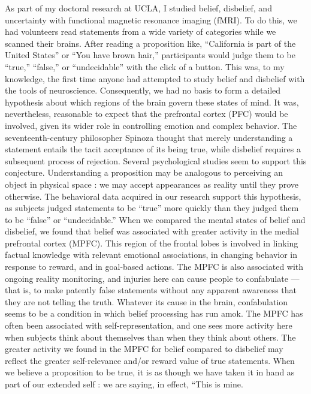 \documentclass[a4paper,14pt]{extarticle}
\begin{document}
As part of my doctoral research at UCLA, I studied belief, disbelief, and uncertainty with functional magnetic resonance imaging (fMRI).
To do this, we had volunteers read statements from a wide variety of categories while we scanned their brains.
After reading a proposition like, ``California is part of the United States'' or ``You have brown hair,'' participants would judge them to be ``true,'' ``false,'' or ``undecidable'' with the click of a button.
This was, to my knowledge, the first time anyone had attempted to study belief and disbelief with the tools of neuroscience.
Consequently, we had no basis to form a detailed hypothesis about which regions of the brain govern these states of mind.
It was, nevertheless, reasonable to expect that the prefrontal cortex (PFC) would be involved, given its wider role in controlling emotion and complex behavior.
The seventeenth-century philosopher Spinoza thought that merely understanding a statement entails the tacit acceptance of its being true, while disbelief requires a subsequent process of rejection.
Several psychological studies seem to support this conjecture.
Understanding a proposition may be analogous to perceiving an object in physical space :
we may accept appearances as reality until they prove otherwise.
The behavioral data acquired in our research support this hypothesis, as subjects judged statements to be ``true'' more quickly than they judged them to be ``false'' or ``undecidable.''
When we compared the mental states of belief and disbelief, we found that belief was associated with greater activity in the medial prefrontal cortex (MPFC).
This region of the frontal lobes is involved in linking factual knowledge with relevant emotional associations, in changing behavior in response to reward, and in goal-based actions.
The MPFC is also associated with ongoing reality monitoring, and injuries here can cause people to confabulate --- that is, to make patently false statements without any apparent awareness that they are not telling the truth.
Whatever its cause in the brain, confabulation seems to be a condition in which belief processing has run amok.
The MPFC has often been associated with self-representation, and one sees more activity here when subjects think about themselves than when they think about others.
The greater activity we found in the MPFC for belief compared to disbelief may reflect the greater self-relevance and/or reward value of true statements.
When we believe a proposition to be true, it is as though we have taken it in hand as part of our extended self :
we are saying, in effect, ``This is mine.
\end{document}
